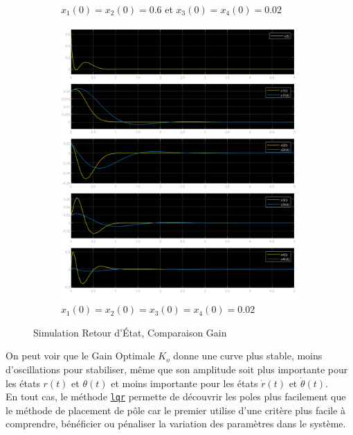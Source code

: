 \documentclass[class=article, crop=false]{standalone}
\begin{document}
\begin{resolution}
\begin{figure}[H]
\begin{subfigure}[b]{0.45\textwidth}
            \caption{$x_1(0) = x_2(0) = 0.6$ et $x_3(0) = x_4(0) = 0.02$}
        \end{subfigure}
        \begin{subfigure}[b]{0.45\textwidth}
            \centering
            \includegraphics[width=\textwidth]{../images/m30_r0_s0.02_o0.png}
            \caption{$x_1(0) = x_2(0) = x_3(0) = x_4(0) = 0.02$}
        \end{subfigure}
        \caption{Simulation Retour d'État, Comparaison Gain}
    \end{figure}
    On peut voir que le Gain Optimale $K_o$ donne une curve plus stable, moins d'oscillations pour stabiliser, même que son amplitude soit plus importante pour les états $r(t)$ et $\theta(t)$ et moins importante pour les états $\dot{r}(t)$ et $\dot{\theta}(t)$.\\

    En tout cas, le méthode \href{https://www.mathworks.com/help/control/ref/lti.lqr.html}{\texttt{lqr}} permette de découvrir les poles plus facilement que le méthode de placement de pôle car le premier utilise d'une critère plus facile à comprendre, bénéficier ou pénaliser la variation des paramètres dans le système.
\end{resolution}
\end{document}
